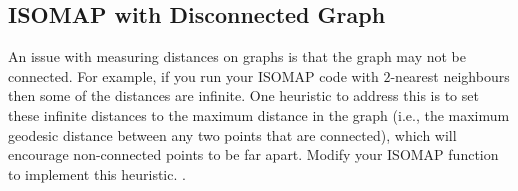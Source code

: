 \documentclass{article}
\begin{document}
\subsection{ISOMAP with Disconnected Graph}

An issue with measuring distances on graphs is that the graph may not be connected. For example, if you run your ISOMAP code with $2$-nearest neighbours then some of the distances are infinite. One heuristic to address this is to set these infinite distances to the maximum distance in the graph (i.e., the maximum geodesic distance between any two points that are connected), which will encourage non-connected points to be far apart. Modify your ISOMAP function to implement this heuristic. .

\end{document}
